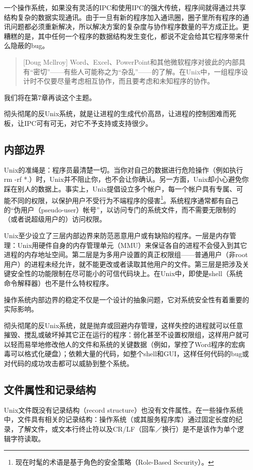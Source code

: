 \documentclass[11pt,oneside]{book}
\begin{document}
\begin{common-format}
一个操作系统，如果没有灵活的IPC和使用IPC的强大传统，程序间就得通过共享结构复杂的数据实现通讯。由于一旦有新的程序加入通讯圈，圈子里所有程序的通讯问题都必须重新解决，所以解决方案的复杂度与协作程序数量的平方成正比。更糟糕的是，其中任何一个程序的数据结构发生变化，都说不定会给其它程序带来什么隐蔽的bug。

\begin{quote}[Doug Mcllroy]
Word、Excel、PowerPoint和其他微软程序对彼此的内部具有“密切”——有些人可能称之为“杂乱”——的了解。在Unix中，一组程序设计时不仅要尽量考虑相互协作，而且要考虑和未知程序的协作。
\end{quote}

我们将在第7章再谈这个主题。

彻头彻尾的反Unix系统，就是让进程的生成代价高昂，让进程的控制困难而死板，让IPC可有可无，对它不予支持或支持很少。

\subsection{内部边界}
Unix的准绳是：程序员最清楚一切。当你对自己的数据进行危险操作（例如执行rm -rf *.）时，Unix并不阻止你，也不会让你确认。另一方面，Unix却小心避免你踩在别人的数据上。事实上，Unix提倡设立多个帐户，每一个帐户具有专属、可能不同的权限，以保护用户不受行为不端程序的侵害\footnote{现在时髦的术语是基于角色的安全策略（Role-Based Security）。}。系统程序通常都有自己的“伪用户（pseudo-user）帐号”，以访问专门的系统文件，而不需要无限制的（或者说超级用户的）访问权限。

Unix至少设立了三层内部边界来防范恶意用户或有缺陷的程序。一层是内存管理：Unix用硬件自身的内存管理单元（MMU）来保证各自的进程不会侵入到其它进程的内存地址空间。第二层是为多用户设置的真正权限组——普通用户（非root用户）的进程未经允许，就不能更改或者读取其他用户的文件。第三层是把涉及关键安全性的功能限制在尽可能小的可信代码块上。在Unix中，即使是shell（系统命令解释器）也不是什么特权程序。

操作系统内部边界的稳定不仅是一个设计的抽象问题，它对系统安全性有着重要的实际影响。

彻头彻尾的反Unix系统，就是抛弃或回避内存管理，这样失控的进程就可以任意摧毁、搅乱或破坏掉其它正在运行的程序：弱化甚至不设置权限组，这样用户就可以轻而易举地修改他人的文件和系统的关键数据（例如，掌控了Word程序的宏病毒可以格式化硬盘）；依赖大量的代码，如整个shell和GUI，这样任何代码的bug或对代码的成功攻击都可以威胁到整个系统。

\subsection{文件属性和记录结构}
Unix文件既没有记录结构（record structure）也没有文件属性。在一些操作系统中，文件具有相关的记录结构：操作系统（或其服务程序库）通过固定长度的纪录，了解文件，或文本行终止符以及CR/LF（回车／换行）是不是该作为单个逻辑字符读取。


\end{common-format}
\end{document}
